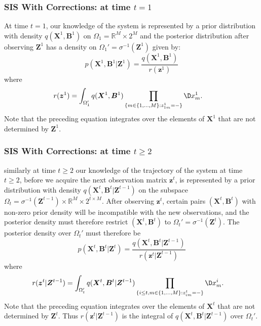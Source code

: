 \documentclass[9pt, xcolor={dvipsnames,svgnames,table}]{beamer}
\newcommand{\Real}{\mathbb R}
\begin{document}
\begin{frame}
    \frametitle{SIS With Corrections: at time $t=1$}
    At time $t=1$, our knowledge of the system is represented by a prior distribution with density $q(\bm{X}^1, \bm{B}^1)$ on $\Omega_1 = \Real^M \times 2^M$ and \textcolor{PineGreen}{the posterior distribution} after observing $\bm{Z}^1$ has a density on $\Omega_1' = \sigma^{-1}(\bm{Z}^1)$ given by:
    \begin{equation*}
        p(\bm{X}^1, \bm{B}^1 |\bm{Z}^1) = \frac{q(\bm{X}^1, \bm{B}^1)} {r(\bm{z}^1)} 
    \end{equation*}
    where
    \begin{align*}
        r(\bm{z}^1)  &= \int_{\Omega_1'} q(\bm{X}^1, \bm{B}^1) \prod_{ \{m \in \{1, \ldots, M \} : z^1_{1m} = - \} } \D x^1_m.
    \end{align*}
    \textcolor{PineGreen}{Note that the preceding equation integrates over the elements of $\bm{X}^1$ that are not determined by $\bm{Z}^1$}.
\end{frame}





\begin{frame}
    \frametitle{SIS With Corrections: at time $t \geq 2$}
    similarly at time $t \geq 2$ our knowledge of the trajectory of the system at time $t \geq 2$, before we acquire the next observation matrix $\bm{z}^t$, is represented by a prior distribution with density $q(\bm{X}^t, \bm{B}^t | \bm{Z}^{t-1})$ on the subspace $\Omega_t = \sigma^{-1}(\bm{Z}^{t-1}) \times \Real^M \times 2^{t \times M}$. After observing $\bm{z}^t$, certain pairs $(\bm{X}^t, \bm{B}^t)$ with non-zero prior density will be incompatible with the new observations, and the posterior density must therefore restrict $(\bm{X}^t, \bm{B}^t)$ to $\Omega_t' = \sigma^{-1}(\bm{Z}^t)$. The posterior density over $\Omega_t'$ must therefore be
    \begin{equation*}
        p(\bm{X}^t, \bm{B}^t |\bm{Z}^t) = \frac{q(\bm{X}^t, \bm{B}^t | \bm{Z}^{t-1})}{r(\bm{z}^t | \bm{Z}^{t-1})} 
    \end{equation*}
    where
    \begin{align*}
        r(\bm{z}^t | \bm{Z}^{t-1})  &= \int_{\Omega_t'} q(\bm{X}^t, \bm{B}^t | \bm{Z}^{t-1}) \prod_{ \{ i \leq t, m \in \{1, \ldots, M \} : z^t_{im} = - \} } \D x^i_m.
    \end{align*}
    Note that the preceding equation integrates over the elements of $\bm{X}^t$ that are not determined by $\bm{Z}^t$. Thus $r(\bm{z}^t | \bm{Z}^{t-1})$ is the integral of $q(\bm{X}^t, \bm{B}^t | \bm{Z}^{t-1})$ over $\Omega_t'$.
\end{frame}
\end{document}
